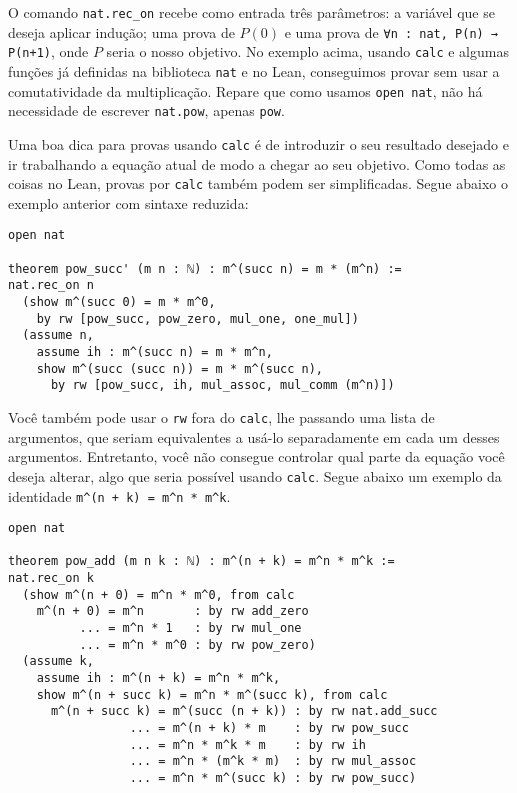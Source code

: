 \begin{center}
O comando \lstinline{nat.rec_on} recebe como entrada três parâmetros: a variável que se deseja aplicar indução; uma prova de $P(0)$ e uma prova de \lstinline{∀n : nat, P(n) → P(n+1)}, onde $P$ seria o nosso objetivo. No exemplo acima, usando \lstinline{calc} e algumas funções já definidas na biblioteca \lstinline{nat} e no Lean, conseguimos provar sem usar a comutatividade da multiplicação. Repare que como usamos \lstinline{open nat}, não há necessidade de escrever \lstinline{nat.pow}, apenas \lstinline{pow}.

Uma boa dica para provas usando \lstinline{calc} é de introduzir o seu resultado desejado e ir trabalhando a equação atual de modo a chegar ao seu objetivo. Como todas as coisas no Lean, provas por \lstinline{calc} também podem ser simplificadas. Segue abaixo o exemplo anterior com sintaxe reduzida:

\begin{lstlisting}
open nat

theorem pow_succ' (m n : ℕ) : m^(succ n) = m * (m^n) :=
nat.rec_on n
  (show m^(succ 0) = m * m^0,
    by rw [pow_succ, pow_zero, mul_one, one_mul])
  (assume n,
    assume ih : m^(succ n) = m * m^n,
    show m^(succ (succ n)) = m * m^(succ n),
      by rw [pow_succ, ih, mul_assoc, mul_comm (m^n)])
\end{lstlisting}

Você também pode usar o \lstinline{rw} fora do \lstinline{calc}, lhe passando uma lista de argumentos, que seriam equivalentes a usá-lo separadamente em cada um desses argumentos.
Entretanto, você não consegue controlar qual parte da equação você deseja alterar, algo que seria possível usando \lstinline{calc}. Segue abaixo um exemplo da identidade \lstinline{m^(n + k) = m^n * m^k}.

\begin{lstlisting}
open nat

theorem pow_add (m n k : ℕ) : m^(n + k) = m^n * m^k :=
nat.rec_on k
  (show m^(n + 0) = m^n * m^0, from calc
    m^(n + 0) = m^n       : by rw add_zero
          ... = m^n * 1   : by rw mul_one
          ... = m^n * m^0 : by rw pow_zero)
  (assume k,
    assume ih : m^(n + k) = m^n * m^k,
    show m^(n + succ k) = m^n * m^(succ k), from calc
      m^(n + succ k) = m^(succ (n + k)) : by rw nat.add_succ
                 ... = m^(n + k) * m    : by rw pow_succ
                 ... = m^n * m^k * m    : by rw ih
                 ... = m^n * (m^k * m)  : by rw mul_assoc
                 ... = m^n * m^(succ k) : by rw pow_succ)
\end{lstlisting}


\end{center}
